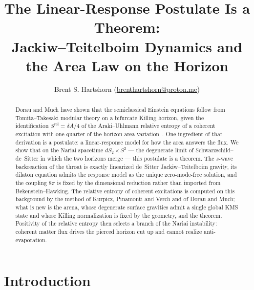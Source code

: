 \documentclass[11pt]{article}
\title{\textbf{The Linear-Response Postulate Is a Theorem:}\\ Jackiw--Teitelboim Dynamics and the Area Law on the \Nariai{} Horizon}
\author{Brent S. Hartshorn \orcidlink{0009-0004-2853-655X} (\url{brenthartshorn@proton.me})}
\newcommand{\Srel}{S^{\mathrm{rel}}}
\newcommand{\Nariai}{Nariai}
\begin{document}
\maketitle

\begin{abstract}
Dorau and Much have shown that the semiclassical Einstein equations follow from Tomita--Takesaki modular theory on a bifurcate Killing horizon, given the identification $\Srel = \delta A/4$ of the Araki--Uhlmann relative entropy of a coherent excitation with one quarter of the horizon area variation~\cite{DorauMuch}. One ingredient of that derivation is a postulate: a linear-response model for how the area answers the flux. We show that on the \Nariai{} spacetime $dS_2 \times S^2$ --- the degenerate limit of Schwarzschild--de~Sitter in which the two horizons merge --- this postulate is a theorem. The $s$-wave backreaction of the throat is exactly linearized de~Sitter Jackiw--Teitelboim gravity, its dilaton equation admits the response model as the unique zero-mode-free solution, and the coupling $8\pi$ is fixed by the dimensional reduction rather than imported from Bekenstein--Hawking. The relative entropy of coherent excitations is computed on this background by the method of Kurpicz, Pinamonti and Verch and of Dorau and Much; what is new is the arena, whose degenerate surface gravities admit a single global KMS state and whose Killing normalization is fixed by the geometry, and the theorem. Positivity of the relative entropy then selects a branch of the \Nariai{} instability: coherent matter flux drives the pierced horizon cut up and cannot realize anti-evaporation.
\end{abstract}

\section{Introduction}
\label{sec:intro}
\end{document}
